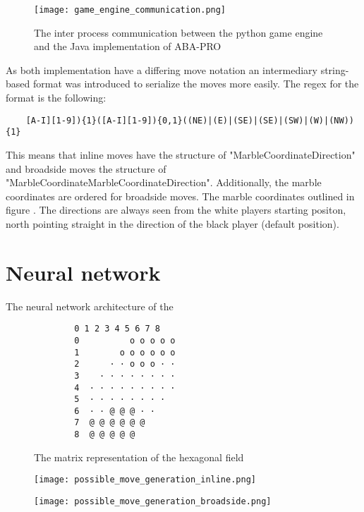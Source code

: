 \begin{figure}
    \centering
    \texttt{[image: game\_engine\_communication.png]}
    \caption{The inter process communication between the python game engine and the Java implementation of ABA-PRO}
    \label{python_java_ipc}
\end{figure}

As both implementation have a differing move notation an intermediary string-based format was introduced to serialize the moves more easily. The regex for the format is the following:

\begin{BVerbatim}
    [A-I][1-9]){1}([A-I][1-9]){0,1}((NE)|(E)|(SE)|(SE)|(SW)|(W)|(NW)){1}
\end{BVerbatim}

This means that inline moves have the structure of "{MarbleCoordinate}{Direction}" and broadside moves the structure of "{MarbleCoordinate}{MarbleCoordinate}{Direction}". Additionally, the marble coordinates are ordered for broadside moves. The marble coordinates outlined in figure . The directions are always seen from the white players starting positon, north pointing straight in the direction of the black player (default position).

\section{Neural network}
The neural network architecture of the

\begin{figure}
    \centering
    \begin{BVerbatim}
        0 1 2 3 4 5 6 7 8
        0          o o o o o
        1        o o o o o o
        2      · · o o o · ·
        3    · · · · · · · ·
        4  · · · · · · · · ·
        5  · · · · · · · ·
        6  · · @ @ @ · ·
        7  @ @ @ @ @ @
        8  @ @ @ @ @
    \end{BVerbatim}
    \caption{The matrix representation of the hexagonal field}
\end{figure}

\begin{figure}
    \centering
    \texttt{[image: possible\_move\_generation\_inline.png]}
    \caption{}
    \label{possible_move_generation_inline}
\end{figure}

\begin{figure}
    \centering
    \texttt{[image: possible\_move\_generation\_broadside.png]}
    \caption{}
    \label{possible_move_generation_broadside}
\end{figure}

